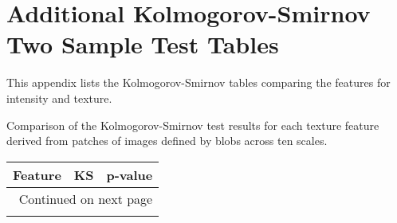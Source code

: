 \chapter{Additional Kolmogorov-Smirnov Two Sample Test Tables}
\label{appendix:ks-test}
This appendix lists the Kolmogorov-Smirnov tables comparing the features for intensity and texture.

\begin{table}[H]
\label{table:blob-texture-ks}
\centering
{}
\caption{Comparison of the Kolmogorov-Smirnov test results for each texture feature derived from patches of images defined by blobs across ten scales.}
\end{table}

\begin{center}
\begin{longtable}{lrr}
\label{table:line-intensity-ks}
\toprule
Feature &        KS &       p-value \\
\midrule
\endhead
\midrule
\multicolumn{3}{r}{{Continued on next page}} \\
\midrule
\endfoot


\end{longtable}
\end{center}
